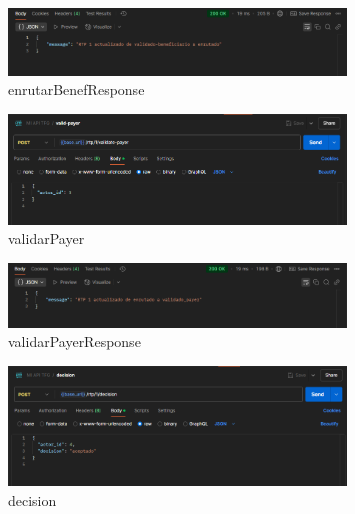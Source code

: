     \begin{figure}[H]
    \centering
    \includegraphics[width=0.8\textwidth]{Imagenes/enrutarBenefResponse.png}
    \caption{enrutarBenefResponse}
    \label{fig:enrutarBenefResponse}
    \end{figure}



    \begin{figure}[H]
    \centering
    \includegraphics[width=0.8\textwidth]{Imagenes/validarPayer.png}
    \caption{validarPayer}
    \label{fig:validarPayer}
    \end{figure}

    \begin{figure}[H]
    \centering
    \includegraphics[width=0.8\textwidth]{Imagenes/validarPayerResponse.png}
    \caption{validarPayerResponse}
    \label{fig:validarPayerResponse}
    \end{figure}



    \begin{figure}[H]
    \centering
    \includegraphics[width=0.8\textwidth]{Imagenes/decision.png}
    \caption{decision}
    \label{fig:decision}
    \end{figure}

